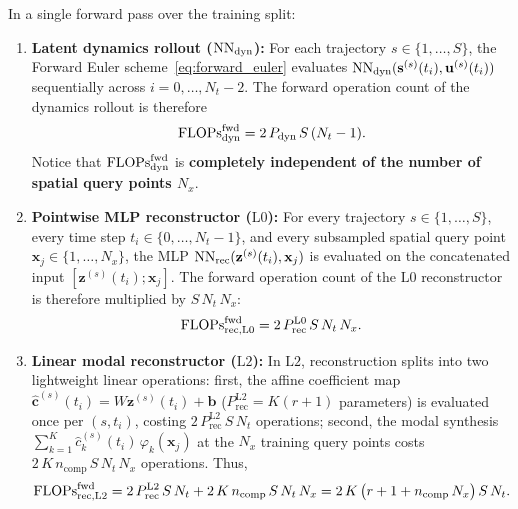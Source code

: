 In a single forward pass over the training split:
\begin{enumerate}[leftmargin=2em]
  \item \textbf{Latent dynamics rollout ($\mathrm{NN}_{\mathrm{dyn}}$):} For each trajectory $s \in \{1,\dots,S\}$, the Forward Euler scheme~\eqref{eq:forward_euler} evaluates $\mathrm{NN}_{\mathrm{dyn}}(\mathbf{s}^{(s)}(t_i), \mathbf{u}^{(s)}(t_i))$ sequentially across $i = 0, \dots, N_t - 2$. The forward operation count of the dynamics rollout is therefore
  \begin{equation}
    \mathrm{FLOPs}_{\mathrm{dyn}}^{\mathrm{fwd}} = 2\,P_{\mathrm{dyn}}\,S\,(N_t - 1).
    \label{eq:flops_dyn_fwd}
  \end{equation}
  Notice that $\mathrm{FLOPs}_{\mathrm{dyn}}^{\mathrm{fwd}}$ is \textbf{completely independent of the number of spatial query points $N_x$}.
  \item \textbf{Pointwise MLP reconstructor ($\mathrm{L0}$):} For every trajectory $s \in \{1,\dots,S\}$, every time step $t_i \in \{0,\dots,N_t-1\}$, and every subsampled spatial query point $\mathbf{x}_j \in \{1,\dots,N_x\}$, the MLP $\mathrm{NN}_{\mathrm{rec}}(\mathbf{z}^{(s)}(t_i), \mathbf{x}_j)$ is evaluated on the concatenated input $[\mathbf{z}^{(s)}(t_i); \mathbf{x}_j]$. The forward operation count of the $\mathrm{L0}$ reconstructor is therefore multiplied by $S\,N_t\,N_x$:
  \begin{equation}
    \mathrm{FLOPs}_{\mathrm{rec, L0}}^{\mathrm{fwd}} = 2\,P_{\mathrm{rec}}^{\mathrm{L0}}\,S\,N_t\,N_x.
    \label{eq:flops_rec_L0_fwd}
  \end{equation}
  \item \textbf{Linear modal reconstructor ($\mathrm{L2}$):} In $\mathrm{L2}$, reconstruction splits into two lightweight linear operations: first, the affine coefficient map $\hat{\mathbf{c}}^{(s)}(t_i) = W\mathbf{z}^{(s)}(t_i) + \mathbf{b}$ ($P_{\mathrm{rec}}^{\mathrm{L2}} = K(r+1)$ parameters) is evaluated once per $(s,t_i)$, costing $2\,P_{\mathrm{rec}}^{\mathrm{L2}}\,S\,N_t$ operations; second, the modal synthesis $\sum_{k=1}^K \hat{c}_k^{(s)}(t_i)\,\varphi_k(\mathbf{x}_j)$ at the $N_x$ training query points costs $2\,K\,n_{\mathrm{comp}}\,S\,N_t\,N_x$ operations. Thus,
  \begin{equation}
    \mathrm{FLOPs}_{\mathrm{rec, L2}}^{\mathrm{fwd}} = 2\,P_{\mathrm{rec}}^{\mathrm{L2}}\,S\,N_t + 2\,K\,n_{\mathrm{comp}}\,S\,N_t\,N_x = 2\,K\,\big(r + 1 + n_{\mathrm{comp}}\,N_x\big)\,S\,N_t.
    \label{eq:flops_rec_L2_fwd}
  \end{equation}
\end{enumerate}

